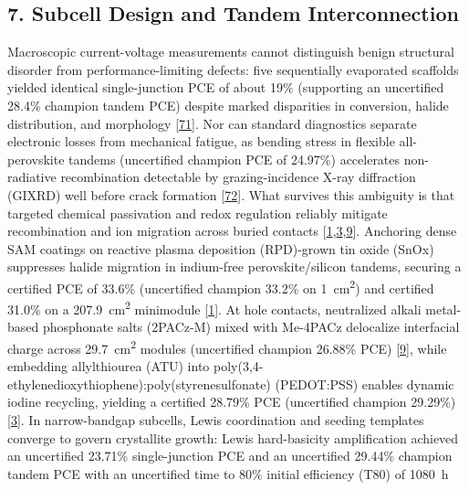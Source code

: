 \documentclass[
  11pt,
]{article}
\begin{document}
\subsection{7. Subcell Design and Tandem
Interconnection}\label{subcell-design-and-tandem-interconnection}

Macroscopic current-voltage measurements cannot distinguish benign
structural disorder from performance-limiting defects: five sequentially
evaporated scaffolds yielded identical single-junction PCE of about 19\%
(supporting an uncertified 28.4\% champion tandem PCE) despite marked
disparities in conversion, halide distribution, and morphology
{[}\href{https://doi.org/10.1021/acsami.6c07582}{71}{]}. Nor can
standard diagnostics separate electronic losses from mechanical fatigue,
as bending stress in flexible all-perovskite tandems (uncertified
champion PCE of 24.97\%) accelerates non-radiative recombination
detectable by grazing-incidence X-ray diffraction (GIXRD) well before
crack formation {[}\href{https://doi.org/10.1021/acsami.6c05001}{72}{]}.
What survives this ambiguity is that targeted chemical passivation and
redox regulation reliably mitigate recombination and ion migration
across buried contacts
{[}\href{https://doi.org/10.1126/science.aef5355}{1},\href{https://doi.org/10.1002/anie.4918900}{3},\href{https://doi.org/10.1038/s41467-026-74288-2}{9}{]}.
Anchoring dense SAM coatings on reactive plasma deposition (RPD)-grown
tin oxide (SnOx) suppresses halide migration in indium-free
perovskite/silicon tandems, securing a certified PCE of 33.6\%
(uncertified champion 33.2\% on \qty{1}{\centi\meter\squared}) and
certified 31.0\% on a \qty{207.9}{\centi\meter\squared} minimodule
{[}\href{https://doi.org/10.1126/science.aef5355}{1}{]}. At hole
contacts, neutralized alkali metal-based phosphonate salts (2PACz-M)
mixed with Me-4PACz delocalize interfacial charge across
\qty{29.7}{\centi\meter\squared} modules (uncertified champion 26.88\%
PCE) {[}\href{https://doi.org/10.1038/s41467-026-74288-2}{9}{]}, while
embedding allylthiourea (ATU) into
poly(3,4-ethylenedioxythiophene):poly(styrenesulfonate) (PEDOT:PSS)
enables dynamic iodine recycling, yielding a certified 28.79\% PCE
(uncertified champion 29.29\%)
{[}\href{https://doi.org/10.1002/anie.4918900}{3}{]}. In narrow-bandgap
subcells, Lewis coordination and seeding templates converge to govern
crystallite growth: Lewis hard-basicity amplification achieved an
uncertified 23.71\% single-junction PCE and an uncertified 29.44\%
champion tandem PCE with an uncertified time to 80\% initial efficiency
(T80) of \qty{1080}{\hour}
\end{document}
